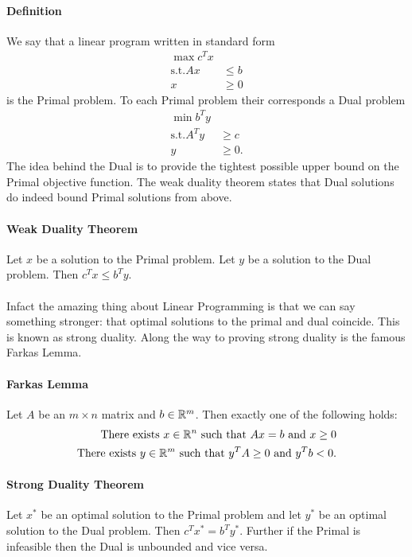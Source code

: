 \documentclass[letterpaper,12pt,oneside,onecolumn]{article}
\begin{document}
\paragraph{Definition}
We say that a linear program written in standard form
\begin{align*}
\max c^Tx \\
\text{s.t.} Ax &\leq b \\
x &\geq 0
\end{align*}
is the Primal problem. To each Primal problem their corresponds a Dual problem
\begin{align*}
\min b^T y\\
\text{s.t.} A^Ty &\geq c \\
y &\geq 0.
\end{align*}
The idea behind the Dual is to provide the tightest possible upper bound on the Primal objective function. The weak duality theorem states that Dual solutions do indeed bound Primal solutions from above.
\paragraph{Weak Duality Theorem}
Let $x$ be a solution to the Primal problem. Let $y$ be a solution to the Dual problem. Then $c^Tx \leq b^Ty$.
\paragraph{}
Infact the amazing thing about Linear Programming is that we can say something stronger: that optimal solutions to the primal and dual coincide. This is known as strong duality. Along the way to proving strong duality is the famous Farkas Lemma.
\paragraph{Farkas Lemma}
Let $A$ be an $m \times n$ matrix and $b \in \mathbb{R}^m$. Then exactly one of the following holds:
\begin{align}
\text{There exists $x\in \mathbb{R}^n$ such that $Ax=b$ and $x\geq 0$}\\
\text{There exists $y \in \mathbb{R}^m$ such that $y^TA \geq 0$ and $y^Tb < 0$.}
\end{align}
\paragraph{Strong Duality Theorem}
Let $x^*$ be an optimal solution to the Primal problem and let $y^*$ be an optimal solution to the Dual problem. Then $c^Tx^* = b^Ty^*$. Further if the Primal is infeasible then the Dual is unbounded and vice versa.
\end{document}
